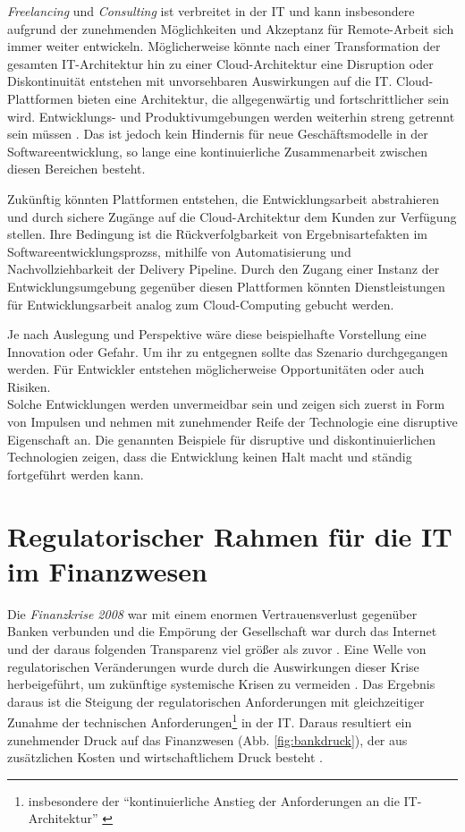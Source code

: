 \emph{Freelancing} und \emph{Consulting} ist verbreitet in der IT und kann insbesondere aufgrund der zunehmenden Möglichkeiten und Akzeptanz für Remote-Arbeit sich immer weiter entwickeln. Möglicherweise könnte nach einer Transformation der gesamten IT-Architektur hin zu einer Cloud-Architektur eine Disruption oder Diskontinuität entstehen mit unvorsehbaren Auswirkungen auf die IT. Cloud-Plattformen bieten eine Architektur, die allgegenwärtig und fortschrittlicher sein wird. Entwicklungs- und Produktivumgebungen werden weiterhin streng getrennt sein müssen \cite{MaRisk:2017}. Das ist jedoch kein Hindernis für neue Geschäftsmodelle in der Softwareentwicklung, so lange eine kontinuierliche Zusammenarbeit zwischen diesen Bereichen besteht.

Zukünftig könnten Plattformen entstehen, die Entwicklungsarbeit abstrahieren und durch sichere Zugänge auf die Cloud-Architektur dem Kunden zur Verfügung stellen. Ihre Bedingung ist die Rückverfolgbarkeit von Ergebnisartefakten im Softwareentwicklungsprozss, mithilfe von Automatisierung und Nachvollziehbarkeit der Delivery Pipeline. Durch den Zugang einer Instanz der Entwicklungsumgebung gegenüber diesen Plattformen könnten Dienstleistungen für Entwicklungsarbeit analog zum Cloud-Computing gebucht werden.

Je nach Auslegung und Perspektive wäre diese beispielhafte Vorstellung eine Innovation oder Gefahr. Um ihr zu entgegnen sollte das Szenario durchgegangen werden. Für Entwickler entstehen möglicherweise Opportunitäten oder auch Risiken. 
\medskip
\\
Solche Entwicklungen werden unvermeidbar sein und zeigen sich zuerst in Form von Impulsen \cite{Bussmann2006} und nehmen mit zunehmender Reife der Technologie eine disruptive Eigenschaft an. Die genannten Beispiele für disruptive und diskontinuierlichen Technologien zeigen, dass die Entwicklung keinen Halt macht und ständig fortgeführt werden kann.

\section{Regulatorischer Rahmen für die IT im Finanzwesen}
Die \emph{Finanzkrise 2008} war mit einem enormen Vertrauensverlust gegenüber Banken verbunden und die Empörung der Gesellschaft war durch das Internet und der daraus folgenden Transparenz viel größer als zuvor \cite{Eismann2015}. Eine Welle von regulatorischen Veränderungen wurde durch die Auswirkungen dieser Krise herbeigeführt, um zukünftige systemische Krisen zu vermeiden \cite{Gupta:2017}. Das Ergebnis daraus ist die Steigung der regulatorischen Anforderungen mit gleichzeitiger Zunahme der technischen Anforderungen\footnote{insbesondere der \enquote{kontinuierliche Anstieg der Anforderungen an die IT-Architektur} \cite{Disterer2013}} in der IT. 
Daraus resultiert ein zunehmender Druck auf das Finanzwesen (Abb. \ref{fig:bankdruck}), der aus zusätzlichen Kosten und wirtschaftlichem Druck besteht \cite{Smolinski2017}.

